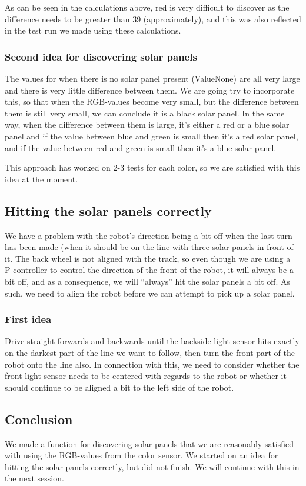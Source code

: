 As can be seen in the calculations above, red is very difficult to
discover as the difference needs to be greater than 39 (approximately),
and this was also reflected in the test run we made using these
calculations.

\subsubsection{Second idea for discovering solar panels}

The values for when there is no solar panel present (ValueNone) are all
very large and there is very little difference between them. We are
going try to incorporate this, so that when the RGB-values become very
small, but the difference between them is still very small, we can
conclude it is a black solar panel. In the same way, when the difference
between them is large, it's either a red or a blue solar panel and if the value between blue and green is small then it's a red solar panel, and if the value between red and green is small then it's a blue solar panel.

This approach has worked on 2-3 tests for each color, so we are
satisfied with this idea at the moment.

\subsection{Hitting the solar panels correctly}

We have a problem with the robot's direction being a bit off when the
last turn has been made (when it should be on the line with three solar
panels in front of it. The back wheel is not aligned with the track, so
even though we are using a P-controller to control the direction of the
front of the robot, it will always be a bit off, and as a consequence,
we will ``always'' hit the solar panels a bit off. As such, we need to
align the robot before we can attempt to pick up a solar panel.

\subsubsection{First idea}

Drive straight forwards and backwards until the backside light sensor
hits exactly on the darkest part of the line we want to follow, then
turn the front part of the robot onto the line also. In connection with
this, we need to consider whether the front light sensor needs to be
centered with regards to the robot or whether it should continue to be
aligned a bit to the left side of the robot.

\subsection{Conclusion}

We made a function for discovering solar panels that we are reasonably
satisfied with using the RGB-values from the color sensor. We started on
an idea for hitting the solar panels correctly, but did not finish. We
will continue with this in the next session.
